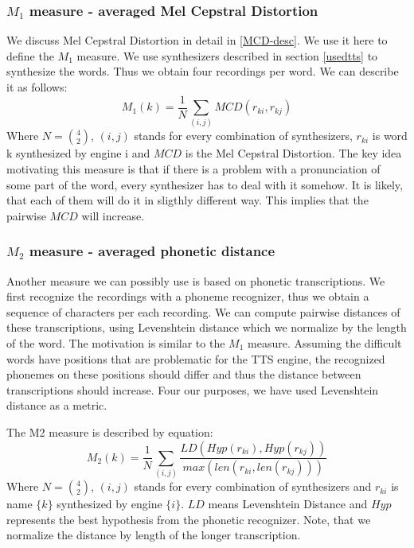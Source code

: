 \subsubsection{$M_1$ measure - averaged Mel Cepstral Distortion}
\label{m1}
We discuss Mel Cepstral Distortion in detail in \ref{MCD-desc}. We use it here to define the $M_1$ measure.
We use synthesizers described in section \ref{usedtts} to synthesize the words. Thus we obtain four recordings per word. 
We can describe it as follows:
\begin{equation}
M_1(k) = \frac{1}{N}\sum_{(i,j)}{MCD(r_{ki},r_{kj})}
\end{equation}
Where $N = {4\choose2}$, $(i,j)$ stands for every combination of synthesizers, $r_{ki}$ is word {k} synthesized by engine {i} and $MCD$ is the Mel Cepstral Distortion.
The key idea motivating this measure is that if there is a problem with a pronunciation of some part of the word, every synthesizer has to deal with it somehow. It is likely, that each of them will do it in sligthly different way. This implies that the pairwise $MCD$ will increase.
\subsubsection{$M_2$ measure - averaged phonetic distance}
\label{m2}
Another measure we can possibly use is based on phonetic transcriptions. We first recognize the recordings with a phoneme recognizer, thus we obtain a sequence of characters per each recording. We can compute pairwise distances of these transcriptions, using Levenshtein \cite{navarro2001guided} distance which we normalize by the length of the word. The motivation is similar to the $M_1$ measure. Assuming the difficult words have positions that are problematic for the TTS engine, the recognized phonemes on these positions should differ and thus the distance between transcriptions should increase. Four our purposes, we have used Levenshtein distance as a metric.
\par
The M2 measure is described by equation:
\begin{equation}
M_2(k) = \frac{1}{N}\sum_{(i,j)}{\frac{LD(Hyp(r_{ki}),Hyp(r_{kj}))}{max(len(r_{ki},len(r_{kj})))}}
\end{equation}
Where $N = {4\choose2}$, $(i,j)$ stands for every combination of synthesizers and $r_{ki}$ is name $\{k\}$ synthesized by engine $\{i\}$. $LD$ means Levenshtein Distance and $Hyp$ represents the best hypothesis from the phonetic recognizer. Note, that we normalize the distance by length of the longer transcription.
